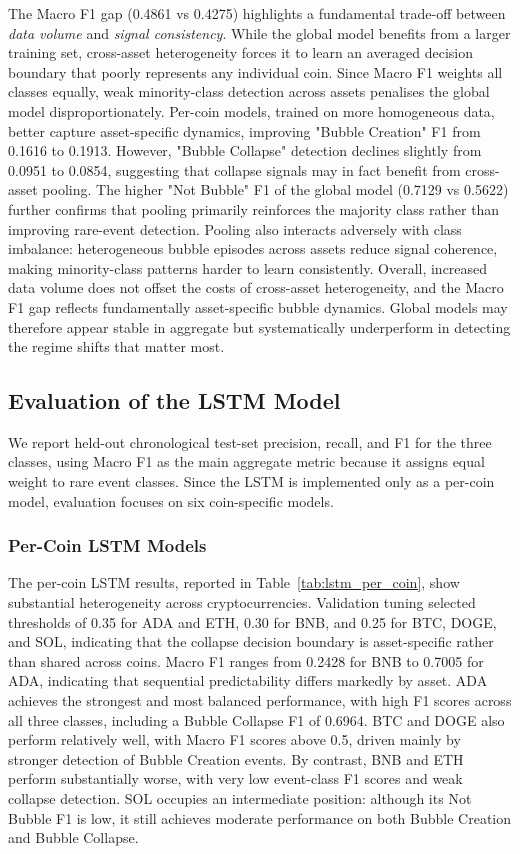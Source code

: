 \documentclass[12pt,a4paper]{article}
\begin{document}
The Macro F1 gap (0.4861 vs 0.4275) highlights a fundamental trade-off between \textit{data volume} and \textit{signal consistency}. While the global model benefits from a larger training set, cross-asset heterogeneity forces it to learn an averaged decision boundary that poorly represents any individual coin. Since Macro F1 weights all classes equally, weak minority-class detection across assets penalises the global model disproportionately. Per-coin models, trained on more homogeneous data, better capture asset-specific dynamics, improving "Bubble Creation" F1 from 0.1616 to 0.1913. However, "Bubble Collapse" detection declines slightly from 0.0951 to 0.0854, suggesting that collapse signals may in fact benefit from cross-asset pooling. The higher "Not Bubble" F1 of the global model (0.7129 vs 0.5622) further confirms that pooling primarily reinforces the majority class rather than improving rare-event detection. Pooling also interacts adversely with class imbalance: heterogeneous bubble episodes across assets reduce signal coherence, making minority-class patterns harder to learn consistently. Overall, increased data volume does not offset the costs of cross-asset heterogeneity, and the Macro F1 gap reflects fundamentally asset-specific bubble dynamics. Global models may therefore appear stable in aggregate but systematically underperform in detecting the regime shifts that matter most.

  
\subsection{Evaluation of the LSTM Model}

We report held-out chronological test-set precision, recall, and F1 for the three classes, using Macro F1 as the main aggregate metric because it assigns equal weight to rare event classes. Since the LSTM is implemented only as a per-coin model, evaluation focuses on six coin-specific models.

\subsubsection{Per-Coin LSTM Models}

The per-coin LSTM results, reported in Table~\ref{tab:lstm_per_coin}, show substantial heterogeneity across cryptocurrencies. Validation tuning selected thresholds of 0.35 for ADA and ETH, 0.30 for BNB, and 0.25 for BTC, DOGE, and SOL, indicating that the collapse decision boundary is asset-specific rather than shared across coins. Macro F1 ranges from 0.2428 for BNB to 0.7005 for ADA, indicating that sequential predictability differs markedly by asset. ADA achieves the strongest and most balanced performance, with high F1 scores across all three classes, including a Bubble Collapse F1 of 0.6964. BTC and DOGE also perform relatively well, with Macro F1 scores above 0.5, driven mainly by stronger detection of Bubble Creation events. By contrast, BNB and ETH perform substantially worse, with very low event-class F1 scores and weak collapse detection. SOL occupies an intermediate position: although its Not Bubble F1 is low, it still achieves moderate performance on both Bubble Creation and Bubble Collapse. 
\end{document}

